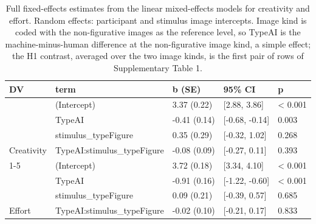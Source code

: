\begin{table}[!h]
\centering
\caption{\label{tab:supp_lmm}Full fixed-effects estimates from the linear mixed-effects models for creativity and effort. Random effects: participant and stimulus image intercepts. Image kind is coded with the non-figurative images as the reference level, so TypeAI is the machine-minus-human difference at the non-figurative image kind, a simple effect; the H1 contrast, averaged over the two image kinds, is the first pair of rows of Supplementary Table 1.}
\centering
\fontsize{9}{11}\selectfont
\begin{tabular}[t]{lllll}
\toprule
DV & term & b (SE) & 95\% CI & p\\
\midrule
 & (Intercept) & 3.37 (0.22) & {}[2.88, 3.86] & < 0.001\\

 & TypeAI & -0.41 (0.14) & {}[-0.68, -0.14] & 0.003\\

 & stimulus\_typeFigure & 0.35 (0.29) & {}[-0.32, 1.02] & 0.268\\

\multirow{-4}{*}{\raggedright\arraybackslash Creativity} & TypeAI:stimulus\_typeFigure & -0.08 (0.09) & {}[-0.27, 0.11] & 0.393\\
\cmidrule{1-5}
 & (Intercept) & 3.72 (0.18) & {}[3.34, 4.10] & < 0.001\\

 & TypeAI & -0.91 (0.16) & {}[-1.22, -0.60] & < 0.001\\

 & stimulus\_typeFigure & 0.09 (0.21) & {}[-0.39, 0.57] & 0.685\\

\multirow{-4}{*}{\raggedright\arraybackslash Effort} & TypeAI:stimulus\_typeFigure & -0.02 (0.10) & {}[-0.21, 0.17] & 0.833\\
\bottomrule
\end{tabular}
\end{table}